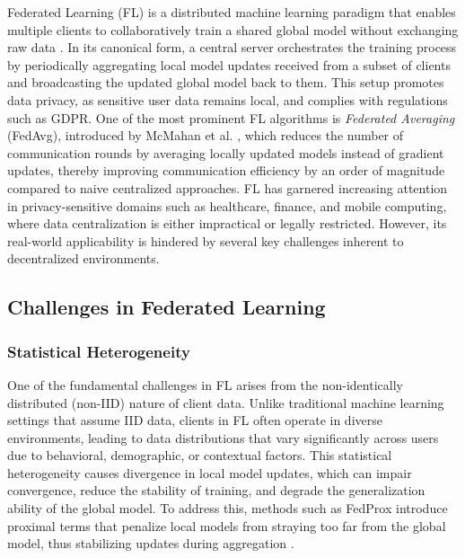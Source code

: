 \documentclass[10pt,twocolumn,letterpaper]{article}
\begin{document}
Federated Learning (FL) is a distributed machine learning paradigm that enables multiple clients to collaboratively train a shared global model without exchanging raw data \cite{kairouz2021advancesopenproblemsfederated}. In its canonical form, a central server orchestrates the training process by periodically aggregating local model updates received from a subset of clients and broadcasting the updated global model back to them. This setup promotes data privacy, as sensitive user data remains local, and complies with regulations such as GDPR. One of the most prominent FL algorithms is \textit{Federated Averaging} (FedAvg), introduced by McMahan et al. \cite{mcmahan2023communicationefficientlearningdeepnetworks}, which reduces the number of communication rounds by averaging locally updated models instead of gradient updates, thereby improving communication efficiency by an order of magnitude compared to naive centralized approaches.
FL has garnered increasing attention in privacy-sensitive domains such as healthcare, finance, and mobile computing, where data centralization is either impractical or legally restricted. However, its real-world applicability is hindered by several key challenges inherent to decentralized environments.

\subsection{Challenges in Federated Learning}

\subsubsection{Statistical Heterogeneity}

One of the fundamental challenges in FL arises from the non-identically distributed (non-IID) nature of client data. Unlike traditional machine learning settings that assume IID data, clients in FL often operate in diverse environments, leading to data distributions that vary significantly across users due to behavioral, demographic, or contextual factors. This statistical heterogeneity causes divergence in local model updates, which can impair convergence, reduce the stability of training, and degrade the generalization ability of the global model. To address this, methods such as FedProx introduce proximal terms that penalize local models from straying too far from the global model, thus stabilizing updates during aggregation \cite{li2020federatedoptimizationheterogeneousnetworks}.
\end{document}
